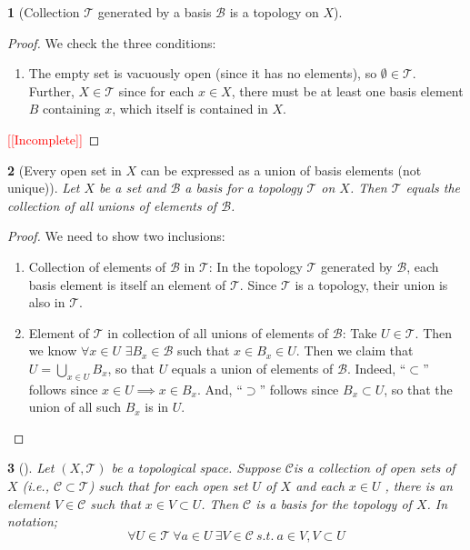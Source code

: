\documentclass[11pt]{article}
\numberwithin{equation}{section}
\theoremstyle{plain}
\newtheorem{theorem}{\color{ForestGreen}{\textbf{Theorem}}}[section]
\newtheorem{lemma}[theorem]{\color{ForestGreen}{\textbf{Lemma}}}
\theoremstyle{definition}
\def\ss{\subset}
\newcommand{\1}{\mathbbm 1}
\newcommand{\cC}{\mathscr C}
\newcommand{\tT}{\mathcal T}
\newcommand{\bB}{\mathcal B}
\begin{document}
\begin{theorem}[Collection $\tT$ generated by a basis $\bB$ is a topology on $X$]
\end{theorem}
\begin{proof}
	We check the three conditions:
	\begin{enumerate}
		\item The empty set is vacuously open (since it has no elements), so $\emptyset \in \tT$. Further, $X \in \tT$ since for each $x \in X$, there must be at least one basis element $B$ containing $x$, which itself is contained in $X$. 
	\end{enumerate}
	\textcolor{red}{[[Incomplete]]}
\end{proof}

\begin{lemma}[Every open set in $X$ can be expressed as a union of basis elements (not unique)]
	Let $X$ be a set and $\bB$ a basis for a topology $\tT$ on $X$. Then $\tT$ equals the collection of all unions of elements of $\bB$. 
\end{lemma}
\begin{proof}
	We need to show two inclusions:
	\begin{enumerate}
		\item Collection of elements of $\bB$ in $\tT$: In the topology $\tT$ generated by $\bB$, each basis element is itself an element of $\tT$. Since $\tT$ is a topology, their union is also in $\tT$. 
		\item Element of $\tT$ in collection of all unions of elements of $\bB$: Take $U \in \tT$. Then we know $\forall x \in U$ $\exists B_x \in \bB$ such that $x \in B_x \in U$. Then we claim that $U = \bigcup_{x \in U} B_x$, so that $U$ equals a union of elements of $\bB$. Indeed, ``$\ss$'' follows since $x \in U \implies x \in B_x$. And, ``$\supset$'' follows since $B_x \ss U$, so that the union of all such $B_x$ is in $U$.  
	\end{enumerate}
\end{proof}

\begin{lemma}[]
	Let $(X,\tT)$ be a topological space. Suppose $\cC$is a collection of open sets of $X$ (i.e., $\cC \ss \tT$) such that for each open set $U$ of $X$ and each $x \in U$ , there is an element $V \in \cC$ such that $x \in V \ss U$. Then $\cC$ is a basis for the topology of $X$. In notation;
	\begin{equation*}
		\forall U \in \tT \ \forall a\in U \ \exists V \in \cC \ s.t. \ a \in V, V \ss U 
	\end{equation*}
	
\end{lemma}
\end{document}
